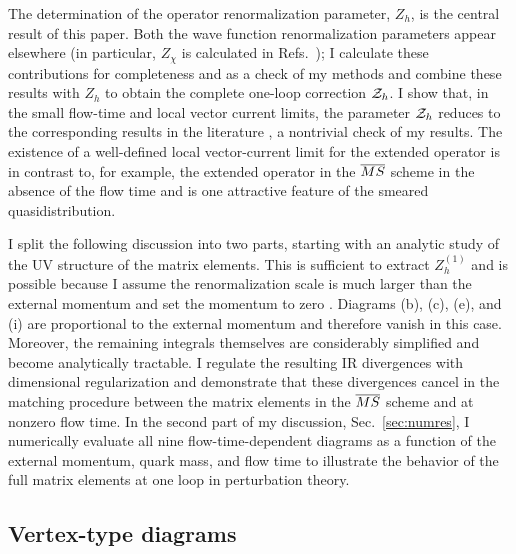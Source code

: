 The determination of the operator renormalization parameter, $Z_h$, is the central result of this paper. Both the wave function renormalization parameters appear elsewhere (in particular, $Z_\chi$ is calculated in Refs.~\cite{Luscher:2013cpa,Makino:2014taa}); I calculate these contributions for completeness and as a check of my methods and combine these results with $Z_h$ to obtain the complete one-loop correction ${\cal Z}_h$. I show that, in the small flow-time and local vector current limits, the parameter ${\cal Z}_h$ reduces to the corresponding results in the literature \cite{Makino:2014taa,Hieda:2016lly}, a nontrivial check of my results. The existence of a well-defined local vector-current limit for the extended operator is in contrast to, for example, the extended operator in the $\overline{MS}$ scheme in the absence of the flow time \cite{Constantinou:2017sej} and is one attractive feature of the smeared quasidistribution.

I split the following discussion into two parts, starting with an analytic study of the UV structure of the matrix elements. This is sufficient to extract $Z_h^{(1)}$ and is possible because I assume the renormalization scale is much larger than the external momentum and set the momentum to zero \cite{Ishikawa:2016znu}. Diagrams (b), (c), (e), and (i) are proportional to the external momentum and therefore vanish in this case. Moreover, the remaining integrals themselves are considerably simplified and become analytically tractable. I regulate the resulting IR divergences with dimensional regularization and demonstrate that these divergences cancel in the matching procedure between the matrix elements in the $\overline{MS}$ scheme and at nonzero flow time. In the second part of my discussion, Sec.~\ref{sec:numres}, I numerically evaluate all nine flow-time-dependent diagrams as a function of the external momentum, quark mass, and flow time to illustrate the behavior of the full matrix elements at one loop in perturbation theory.


\subsection{Vertex-type diagrams}

